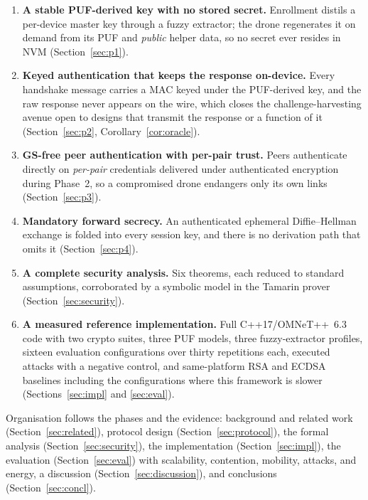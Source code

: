 \documentclass[journal]{IEEEtran}
\begin{document}
\begin{enumerate}
\item \textbf{A stable PUF-derived key with no stored secret.} Enrollment
distils a per-device master key through a fuzzy extractor; the drone
regenerates it on demand from its PUF and \emph{public} helper data, so no
secret ever resides in NVM (Section~\ref{sec:p1}).
\item \textbf{Keyed authentication that keeps the response on-device.} Every
handshake message carries a MAC keyed under the PUF-derived key, and the raw
response never appears on the wire, which closes the challenge-harvesting
avenue open to designs that transmit the response or a function of it
(Section~\ref{sec:p2}, Corollary~\ref{cor:oracle}).
\item \textbf{GS-free peer authentication with per-pair trust.} Peers
authenticate directly on \emph{per-pair} credentials delivered under
authenticated encryption during Phase~2, so a compromised drone endangers only
its own links (Section~\ref{sec:p3}).
\item \textbf{Mandatory forward secrecy.} An authenticated ephemeral
Diffie--Hellman exchange is folded into every session key, and there is no
derivation path that omits it (Section~\ref{sec:p4}).
\item \textbf{A complete security analysis.} Six theorems, each reduced to
standard assumptions, corroborated by a symbolic model in the Tamarin prover
(Section~\ref{sec:security}).
\item \textbf{A measured reference implementation.} Full C++17/OMNeT++~6.3
code with two crypto suites, three PUF models, three fuzzy-extractor profiles,
sixteen evaluation configurations over thirty repetitions each, executed
attacks with a negative control, and same-platform RSA and ECDSA baselines
including the configurations where this framework is slower
(Sections~\ref{sec:impl} and \ref{sec:eval}).
\end{enumerate}

Organisation follows the phases and the evidence: background and related work
(Section~\ref{sec:related}), protocol design
(Section~\ref{sec:protocol}), the formal analysis
(Section~\ref{sec:security}), the implementation
(Section~\ref{sec:impl}), the evaluation (Section~\ref{sec:eval}) with
scalability, contention, mobility, attacks, and energy, a discussion
(Section~\ref{sec:discussion}), and conclusions (Section~\ref{sec:concl}).

\end{document}
